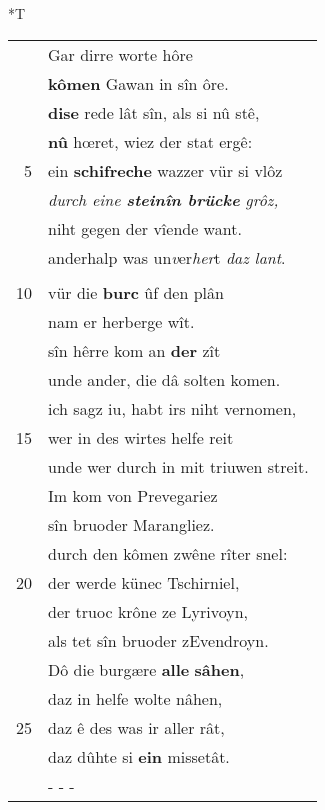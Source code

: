 \documentclass[8pt,a4paper,notitlepage]{article}
\begin{document}
\begin{table}[ht]
\begin{minipage}[t]{0.5\linewidth}
\end{minipage}
\hspace{0.5cm}
\begin{minipage}[t]{0.5\linewidth}
\small
\begin{center}*T
\end{center}
\begin{tabular}{rl}
 & Gar dirre worte hôre\\ 
 & \textbf{kômen} Gawan in sîn ôre.\\ 
 & \textbf{dise} rede lât sîn, als si nû stê,\\ 
 & \textbf{nû} hœret, wiez der stat ergê:\\ 
5 & ein \textbf{schifreche} wazzer vür si vlôz\\ 
 & \textit{durch eine \textbf{steinîn brücke} grôz,}\\ 
 & niht gegen der vîende want.\\ 
 & anderhalp was un\textit{v}er\textit{her}t \textit{daz lant}.\\ 
 & \textbf{\begin{large}S\end{large}în} marschalc kom geriten sân.\\ 
10 & vür die \textbf{burc} ûf den plân\\ 
 & nam er herberge wît.\\ 
 & sîn hêrre kom an \textbf{der} zît\\ 
 & unde ander, die dâ solten komen.\\ 
 & ich sagz iu, habt irs niht vernomen,\\ 
15 & wer in des wirtes helfe reit\\ 
 & unde wer durch in mit triuwen streit.\\ 
 & Im kom von Prevegariez\\ 
 & sîn bruoder Marangliez.\\ 
 & durch den kômen zwêne rîter snel:\\ 
20 & der werde künec Tschirniel,\\ 
 & der truoc krône ze Lyrivoyn,\\ 
 & als tet sîn bruoder zEvendroyn.\\ 
 & Dô die burgære \textbf{alle} \textbf{sâhen},\\ 
 & daz in helfe wolte nâhen,\\ 
25 & daz ê des was ir aller rât,\\ 
 & daz dûhte si \textbf{ein} missetât.\\ 
 & \multicolumn{1}{l}{ - - - }\\ 

\end{tabular}
\end{minipage}
\end{table}
\end{document}
